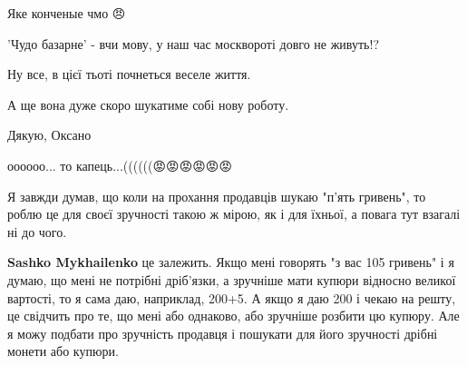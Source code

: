\begin{itemize}
 
Яке конченые чмо 😠

 
'Чудо базарне' - вчи мову, у наш час москвороті довго не живуть!?

 
Ну все, в цієї тьоті почнеться веселе життя.

А ще вона дуже скоро шукатиме собі нову роботу.

Дякую, Оксано

 
оооооо... то капець...((((((😡😡😡😡😡😡

 

Я завжди думав, що коли на прохання продавців шукаю "п'ять гривень", то роблю
це для своєї зручності такою ж мірою, як і для їхньої, а повага тут взагалі
ні до чого.

\begin{itemize}
 
\textbf{Sashko Mykhailenko} це залежить. Якщо мені говорять "з вас 105 гривень"
і я думаю, що мені не потрібні дріб'язки, а зручніше мати купюри відносно
великої вартості, то я сама даю, наприклад, 200+5. А якщо я даю 200 і чекаю на
решту, це свідчить про те, що мені або однаково, або зручніше розбити цю
купюру. Але я можу подбати про зручність продавця і пошукати для його зручності
дрібні монети або купюри.


\end{itemize}
\end{itemize}
